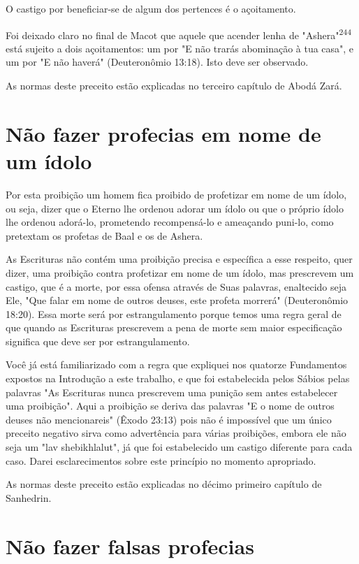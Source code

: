 \begin{itemize}
\begin{enumrate}
\begin{itemize}
\begin{itemize}
\begin{itemize}
O castigo por beneficiar-se de algum dos pertences é o açoitamento.


Foi deixado claro no final de Macot que aquele que acender lenha de
"Ashera"\textsuperscript{244} está sujeito a dois açoitamentos: um por
"E não trarás abomi­nação à tua casa", e um por "E não haverá"
(Deuteronômio 13:18). Isto deve ser observado.

As normas deste preceito estão explicadas no terceiro capítulo de Abodá
Zará.

\section{Não fazer profecias em nome de um ídolo}

Por esta proibição um homem fica proibido de profetizar em nome de um
ídolo, ou seja, dizer que o Eterno lhe ordenou adorar um ídolo ou que o
próprio ídolo lhe ordenou adorá-lo, prometendo recompensá-lo e
ameaçan­do puni-lo, como pretextam os profetas de Baal e os de Ashera.

As Escrituras não contém uma proibição precisa e específica a esse
respeito, quer dizer, uma proibição contra profetizar em nome de um
ídolo, mas prescrevem um castigo, que é a morte, por essa ofensa através
de Suas pa­lavras, enaltecido seja Ele, "Que falar em nome de outros
deuses, este profeta morrerá" (Deuteronômio 18:20). Essa morte será por
estrangulamento porque temos uma regra geral de que quando as Escrituras
prescrevem a pena de mor­te sem maior especificação significa que deve
ser por estrangulamento.

Você já está familiarizado com a regra que expliquei nos quatorze
Fundamentos expostos na Introdução a este trabalho, e que foi
estabelecida pelos Sábios pelas palavras "As Escrituras nunca prescrevem
uma punição sem antes estabelecer uma proibição". Aqui a proibição se
deriva das palavras "E o nome de outros deuses não mencionareis" (Êxodo
23:13) pois não é impossí­vel que um único preceito negativo sirva como
advertência para várias proibi­ções, embora ele não seja um "lav
shebikhlalut", já que foi estabelecido um castigo diferente para cada
caso. Darei esclarecimentos sobre este princípio no momento apropriado.

As normas deste preceito estão explicadas no décimo primeiro capí­tulo
de Sanhedrin.

\section{Não fazer falsas profecias}


\end{itemize}
\end{itemize}
\end{itemize}
\end{enumrate}
\end{itemize}
